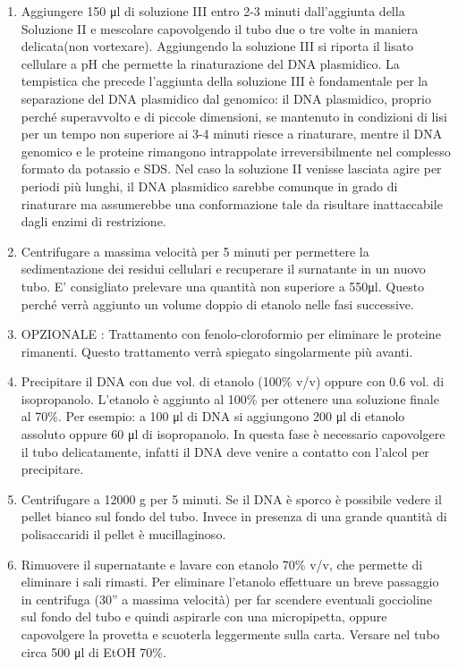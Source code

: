 \begin{enumerate}
  \item Aggiungere 150 μl di soluzione III entro 2-3 minuti dall’aggiunta della Soluzione II e
	mescolare capovolgendo il tubo due o tre volte in maniera delicata(non vortexare).
	Aggiungendo la soluzione III si riporta il lisato cellulare a pH che permette la rinaturazione del DNA plasmidico.
	La tempistica che precede l’aggiunta della soluzione III è fondamentale per la separazione del DNA plasmidico dal genomico:
	il DNA plasmidico, proprio perché superavvolto e di piccole dimensioni, se mantenuto in condizioni di lisi per un tempo non
	superiore ai 3-4 minuti riesce a rinaturare, mentre il DNA genomico e le proteine rimangono intrappolate irreversibilmente nel
	complesso formato da potassio e SDS. Nel caso la soluzione II venisse lasciata agire per periodi più lunghi,
	il DNA plasmidico sarebbe comunque in grado di rinaturare ma assumerebbe una conformazione tale da risultare inattaccabile
	dagli enzimi di restrizione.

  \item Centrifugare a massima velocità per 5 minuti per permettere la sedimentazione dei residui cellulari e recuperare
	il surnatante in un nuovo tubo. E’ consigliato prelevare una quantità non superiore a 550μl.
	Questo perché verrà aggiunto un volume doppio di etanolo nelle fasi successive.

  \item OPZIONALE : Trattamento con fenolo-cloroformio per eliminare le proteine rimanenti. Questo trattamento verrà
	spiegato singolarmente più avanti.

  \item Precipitare il DNA con due vol. di etanolo (100\% v/v) oppure con 0.6 vol. di isopropanolo. L'etanolo è aggiunto
	al 100\% per ottenere una soluzione finale al 70\%. Per esempio: a 100 μl di DNA si aggiungono 200 μl di etanolo
	assoluto oppure 60 μl di isopropanolo. In questa fase è necessario capovolgere il tubo delicatamente, infatti il DNA
	deve venire a contatto con l’alcol per precipitare.

  \item Centrifugare a 12000 g per 5 minuti. Se il DNA è sporco è possibile vedere il pellet bianco sul fondo del tubo.
	Invece in presenza di una grande quantità di polisaccaridi il pellet è mucillaginoso.

  \item Rimuovere il supernatante e lavare con etanolo 70\% v/v, che permette di eliminare i sali rimasti.
	Per eliminare l’etanolo effettuare un breve passaggio in centrifuga (30” a massima velocità) per far scendere eventuali
	goccioline sul fondo del tubo e quindi aspirarle con una micropipetta, oppure capovolgere la provetta e scuoterla
	leggermente sulla carta. Versare nel tubo circa 500 μl di EtOH 70\%.


\end{enumerate}

